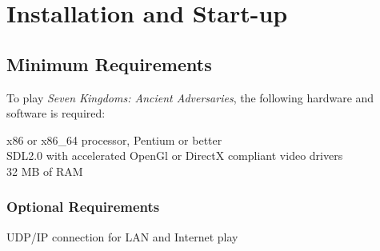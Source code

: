 
\chapter{Installation and Start-up}

\section{Minimum Requirements}

To play \textit{Seven Kingdoms: Ancient Adversaries}, the following hardware and software is required:

\begin{adjustwidth}{1cm}{}
x86 or x86\_64 processor, Pentium or better \\
SDL2.0 with accelerated OpenGl or DirectX compliant video drivers \\
32 MB of RAM
\end{adjustwidth}

\subsection{Optional Requirements}

\begin{adjustwidth}{1cm}{}
UDP/IP connection for LAN and Internet play
\end{adjustwidth}



